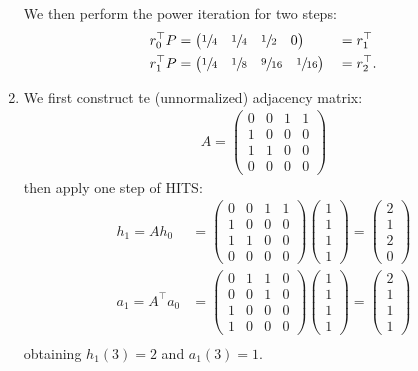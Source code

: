 \begin{enumerate}
  We then perform the power iteration for two steps:
  \begin{alignat*}{2}
    r_0^\top P &=
      \begin{pmatrix}
        \sfrac{1}{4}&\sfrac{1}{4}&\sfrac{1}{2}&0
      \end{pmatrix} &&= r_1^\top \\
    r_1^\top P &=
      \begin{pmatrix}
        \sfrac{1}{4}&\sfrac{1}{8}&\sfrac{9}{16}&\sfrac{1}{16}
      \end{pmatrix} &&= r_2^\top.
  \end{alignat*}

  \item We first construct te (unnormalized) adjacency matrix:
  \begin{align*}
    A =
    \begin{pmatrix}
      0&0&1&1 \\
      1&0&0&0 \\
      1&1&0&0 \\
      0&0&0&0
    \end{pmatrix}
  \end{align*}
  then apply one step of HITS:
  \begin{align*}
    h_1 = Ah_0 &=
    \begin{pmatrix}
      0&0&1&1 \\
      1&0&0&0 \\
      1&1&0&0 \\
      0&0&0&0
    \end{pmatrix}
    \begin{pmatrix}
      1\\1\\1\\1
    \end{pmatrix}
    =
    \begin{pmatrix}
      2\\1\\2\\0
    \end{pmatrix}\\
    a_1 = A^\top a_0 &=
    \begin{pmatrix}
      0&1&1&0 \\
      0&0&1&0 \\
      1&0&0&0 \\
      1&0&0&0
    \end{pmatrix}
    \begin{pmatrix}
      1\\1\\1\\1
    \end{pmatrix}
    =
    \begin{pmatrix}
      2\\1\\1\\1
    \end{pmatrix}\\
  \end{align*}
  obtaining $h_1(3) = 2$ and $a_1(3) = 1$.


\end{enumerate}

